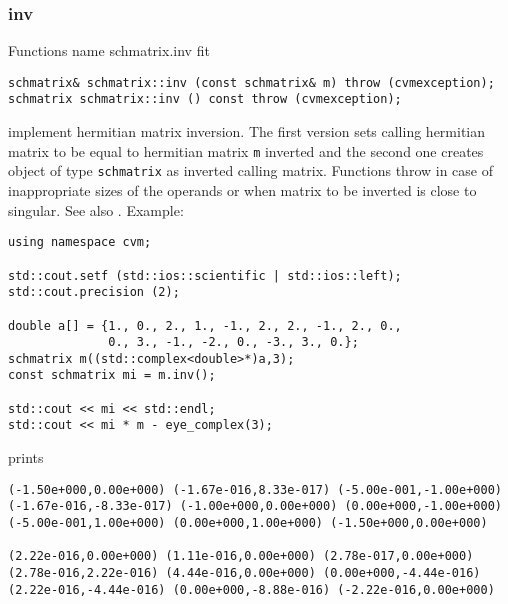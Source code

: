 \subsubsection{inv}
Functions%
\pdfdest name {schmatrix.inv} fit
\begin{verbatim}
schmatrix& schmatrix::inv (const schmatrix& m) throw (cvmexception);
schmatrix schmatrix::inv () const throw (cvmexception);
\end{verbatim}
implement hermitian matrix inversion.
The first version sets  calling hermitian matrix to be equal to 
 hermitian matrix \verb"m" inverted and the second one
creates  object of type \verb"schmatrix" as inverted calling matrix.
Functions throw   
in case of inappropriate
sizes of the operands or when  matrix to be inverted is close to
singular.
See also
.
Example:
\begin{Verbatim}
using namespace cvm;

std::cout.setf (std::ios::scientific | std::ios::left); 
std::cout.precision (2);

double a[] = {1., 0., 2., 1., -1., 2., 2., -1., 2., 0.,
              0., 3., -1., -2., 0., -3., 3., 0.};
schmatrix m((std::complex<double>*)a,3);
const schmatrix mi = m.inv();

std::cout << mi << std::endl;
std::cout << mi * m - eye_complex(3);
\end{Verbatim}
prints
\begin{Verbatim}
(-1.50e+000,0.00e+000) (-1.67e-016,8.33e-017) (-5.00e-001,-1.00e+000)
(-1.67e-016,-8.33e-017) (-1.00e+000,0.00e+000) (0.00e+000,-1.00e+000)
(-5.00e-001,1.00e+000) (0.00e+000,1.00e+000) (-1.50e+000,0.00e+000)

(2.22e-016,0.00e+000) (1.11e-016,0.00e+000) (2.78e-017,0.00e+000)
(2.78e-016,2.22e-016) (4.44e-016,0.00e+000) (0.00e+000,-4.44e-016)
(2.22e-016,-4.44e-016) (0.00e+000,-8.88e-016) (-2.22e-016,0.00e+000)
\end{Verbatim}
\newpage



